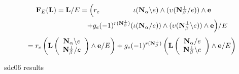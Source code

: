 \documentclass{beamer}
\newcommand{\ext}[1]{\ensuremath{\mathbf{#1}}}
\newcommand{\Is}{\ensuremath{\iota}}
\newcommand{\Vs}{\ensuremath{\upsilon}}
\begin{document}
\begin{frame}


\[
\begin{split}
  \ext{F}_E(\ext{L}) = \ext{L}/E 
   = \Big( r_e  \;\;\; \;\;\;\;\;\;\;\;\;\;\;\;\;\; & \Is(\eNal\backslash e)  \wedge (\Vs(\eNbePe/e))      \wedge  \ext{e} \\
   \;\;+ g_e (-1)^{r(\eNbePe)} ( & \Is(\eNal/e))\wedge(\Vs(\eNbePe\backslash e))   \wedge  \ext{e}\Big) / E \\
\end{split}
\]
\[  = r_e\left(\ext{L}\left(\begin{array}{c} \eNal\backslash e \\
    \eNbePe/e  \end{array} \right)  \wedge \ext{e} /E \right) +
   g_e(-1)^{r(\eNbePe)}\left(\ext{L}\left(\begin{array}{c} \eNal /e \\
    \eNbePe \backslash e \end{array} \right) \wedge \ext{e} /E \right)
\]

\end{frame}

\begin{frame}{sdc06 results}
\end{frame}
\end{document}
